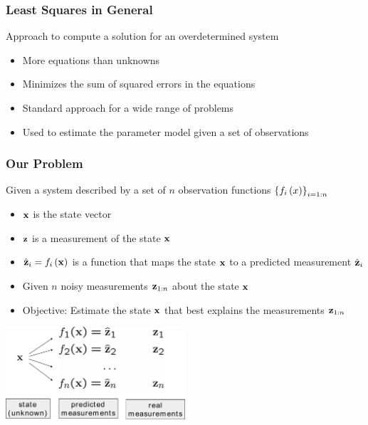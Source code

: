 \begin{frame}
    \frametitle{Least Squares in General}
    
    Approach to compute a solution for an overdetermined system

    \begin{itemize}
        \item More equations than unknowns
        \item Minimizes the sum of squared errors in the equations
        \item Standard approach for a wide range of problems
        \item Used to estimate the parameter model given a set of observations
    \end{itemize}
\end{frame}

\begin{frame}
    \frametitle{Our Problem}
    
    Given a system described by a set of $n$ observation functions $\left\{f_{i}\left(x\right)\right\}_{i=1:n}$

    \begin{itemize}
        \item $\boldsymbol{\mathbf{x}}$ is the state vector
        \item $\boldsymbol{\mathbf{z}}$ is a measurement of the state $\boldsymbol{\mathbf{x}}$
        \item $\hat{\boldsymbol{\mathbf{z}}}_{i} = f_{i}\left(\boldsymbol{\mathbf{x}}\right)$ is a function that maps the state $\boldsymbol{\mathbf{x}}$ to a predicted measurement $\hat{\boldsymbol{\mathbf{z}}}_{i}$
        \item Given $n$ noisy measurements $\boldsymbol{\mathbf{z}}_{1:n}$ about the state $\boldsymbol{\mathbf{x}}$
        \item Objective: Estimate the state $\boldsymbol{\mathbf{x}}$ that best explains the measurements $\boldsymbol{\mathbf{z}}_{1:n}$
    \end{itemize}

    \begin{center}
        \includegraphics[width=0.5\textwidth]{images/least_squares.pdf}
    \end{center}

\end{frame}

